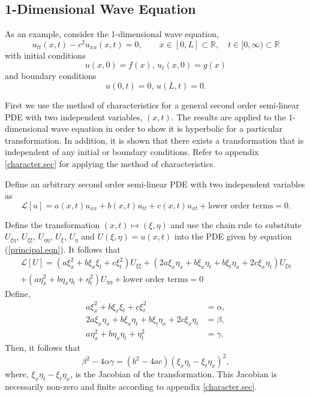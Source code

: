 \documentclass[12pt]{article}
\theoremstyle{definition}
\numberwithin{equation}{section}
\begin{document}
\subsection{1-Dimensional Wave Equation}
As an example, consider the 1-dimensional wave equation,
\begin{equation}
u_{tt}(x,t)-c^2u_{xx}(x,t)=0,\qquad x\in[0,L]\subset\mathbb{R},\quad t\in[0,\infty)\subset\mathbb{R}
\label{1dim_wave.eqn}
\end{equation}
with initial conditions 
$$u(x,0)=f(x),\, u_t(x,0)=g(x)$$ and boundary conditions
$$u(0,t)=0,\,u(L,t)=0.$$

First we use the method of characteristics for a general second order semi-linear PDE with two independent variables, $(x,t)$. The results are applied to the $1$-dimensional wave equation in order to show it is hyperbolic for a particular transformation. In addition, it is shown that there exists a transformation that is independent of any initial or boundary conditions. Refer to appendix \ref{character.sec} for applying the method of characteristics. 

Define an arbitrary second order semi-linear PDE with two independent variables as
\begin{equation}
\mathcal{L}[u]=a(x,t)u_{xx}+b(x,t)u_{tt}+c(x,t)u_{xt}+\mbox{lower order terms}=0.
\label{principal1.eqn}
\end{equation}

Define the transformation $(x,t)\mapsto(\xi,\eta)$ and use the chain rule to substitute $U_{\xi\eta}$, $U_{\xi\xi}$, $U_{\eta\eta}$, $U_\xi$, $U_\eta$ and $U(\xi,\eta)=u(x,t)$ into the PDE given by equation (\ref{principal.eqn}). It follows that
\begin{multline}
\mathcal{L}[U]=(a\xi_x^2+b\xi_x\xi_t+c\xi^2_t)U_{\xi\xi}+(2a\xi_x\eta_x+b\xi_x\eta_t+b\xi_t\eta_x+2c\xi_x\eta_t)U_{\xi\eta}\\+(a\eta^2_x+b\eta_x\eta_t+\eta^2_t)U_{\eta\eta}+\mbox{lower order terms}=0
\end{multline}
Define,
\begin{align*}
a\xi_x^2+b\xi_x\xi_t+c\xi^2_t&=\alpha,\\
2a\xi_x\eta_x+b\xi_x\eta_t+b\xi_t\eta_x+2c\xi_x\eta_t&=\beta,\\
a\eta^2_x+b\eta_x\eta_t+\eta^2_t&=\gamma.
\end{align*}
Then, it follows that
$$\beta^2-4\alpha\gamma=(b^2-4ac)(\xi_x\eta_t-\xi_t\eta_x)^2,$$
where, $\xi_x\eta_t-\xi_t\eta_x$, is the Jacobian of the transformation. This Jacobian is necessarily non-zero and finite according to appendix \ref{character.sec}.
\end{document}
